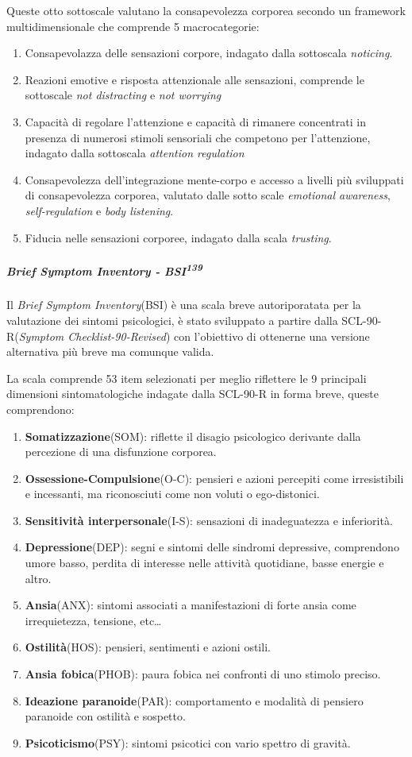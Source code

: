 \documentclass[12pt]{article}
\makeatletter
\newcommand{\cslcitation}[2]
 {\protect\hyper@linkstart{cite}{citeproc_bib_item_#1}#2\hyper@linkend}
\makeatother
\begin{document}
Queste otto sottoscale valutano la consapevolezza corporea secondo un framework multidimensionale che comprende 5 macrocategorie:
\begin{enumerate}
\item Consapevolazza delle sensazioni corpore, indagato dalla sottoscala \emph{noticing}.
\item Reazioni emotive e risposta attenzionale alle sensazioni, comprende le sottoscale \emph{not distracting} e \emph{not worrying}
\item Capacità di regolare l'attenzione e capacità di rimanere concentrati in presenza di numerosi stimoli sensoriali che competono per l'attenzione, indagato dalla sottoscala \emph{attention regulation}
\item Consapevolezza dell'integrazione mente-corpo e accesso a livelli più sviluppati di consapevolezza corporea, valutato dalle sotto scale \emph{emotional awareness}, \emph{self-regulation} e \emph{body listening}.
\item Fiducia nelle sensazioni corporee, indagato dalla scala \emph{trusting}.
\end{enumerate}
\subparagraph{Brief Symptom Inventory - BSI\textsuperscript{\cslcitation{139}{139}}}
\label{sec:org4196149}
Il \textit{Brief Symptom Inventory}(BSI) è una scala breve autoriporatata per la valutazione dei sintomi psicologici, è stato sviluppato a partire dalla SCL-90-R(\textit{Symptom Checklist-90-Revised}) con l'obiettivo di ottenerne una versione alternativa più breve ma comunque valida.

La scala comprende 53 item selezionati per meglio riflettere le 9 principali dimensioni sintomatologiche indagate dalla SCL-90-R in forma breve, queste comprendono:
\begin{enumerate}
\item \textbf{Somatizzazione}(SOM): riflette il disagio psicologico derivante dalla percezione di una disfunzione corporea.
\item \textbf{Ossessione-Compulsione}(O-C): pensieri e azioni percepiti come irresistibili e incessanti, ma riconosciuti come non voluti o ego-distonici.
\item \textbf{Sensitività interpersonale}(I-S): sensazioni di inadeguatezza e inferiorità.
\item \textbf{Depressione}(DEP): segni e sintomi delle sindromi depressive, comprendono umore basso, perdita di interesse nelle attività quotidiane, basse energie e altro.
\item \textbf{Ansia}(ANX): sintomi associati a manifestazioni di forte ansia come irrequietezza, tensione, etc\ldots{}
\item \textbf{Ostilità}(HOS): pensieri, sentimenti e azioni ostili.
\item \textbf{Ansia fobica}(PHOB): paura fobica nei confronti di uno stimolo preciso.
\item \textbf{Ideazione paranoide}(PAR): comportamento e modalità di pensiero paranoide con ostilità e sospetto.
\item \textbf{Psicoticismo}(PSY): sintomi psicotici con vario spettro di gravità.
\end{enumerate}
\end{document}
